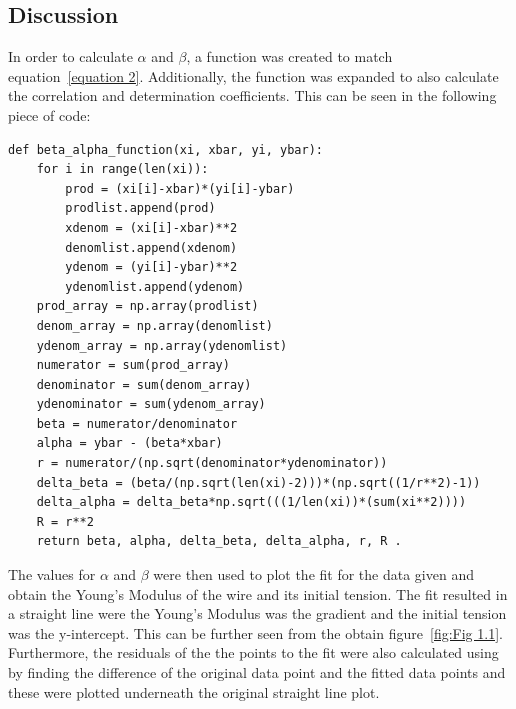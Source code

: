 \documentclass[12pt, a4paper]{article}
\begin{document}
\subsection{Discussion}
In order to calculate \(\alpha\) and \(\beta\), a function was created to match equation~\ref{equation 2}. Additionally, the function was expanded to also calculate the correlation and determination coefficients. This can be seen in the following piece of code:
\begin{verbatim}
def beta_alpha_function(xi, xbar, yi, ybar):
    for i in range(len(xi)):
        prod = (xi[i]-xbar)*(yi[i]-ybar)
        prodlist.append(prod)
        xdenom = (xi[i]-xbar)**2
        denomlist.append(xdenom)
        ydenom = (yi[i]-ybar)**2
        ydenomlist.append(ydenom)
    prod_array = np.array(prodlist)
    denom_array = np.array(denomlist)
    ydenom_array = np.array(ydenomlist)
    numerator = sum(prod_array)
    denominator = sum(denom_array)
    ydenominator = sum(ydenom_array)
    beta = numerator/denominator
    alpha = ybar - (beta*xbar)
    r = numerator/(np.sqrt(denominator*ydenominator))
    delta_beta = (beta/(np.sqrt(len(xi)-2)))*(np.sqrt((1/r**2)-1))
    delta_alpha = delta_beta*np.sqrt(((1/len(xi))*(sum(xi**2))))
    R = r**2
    return beta, alpha, delta_beta, delta_alpha, r, R .
\end{verbatim}
The values for \(\alpha\) and \(\beta\) were then used to plot the fit for the data given and obtain the Young's Modulus of the wire and its initial tension. The fit resulted in a straight line were the Young's Modulus was the gradient and the initial tension was the y-intercept. This can be further seen from the obtain figure~\ref{fig:Fig 1.1}. Furthermore, the residuals of the the points to the fit were also calculated using by finding the difference of the original data point and the fitted data points and these were plotted underneath the original straight line plot. 
\end{document}
